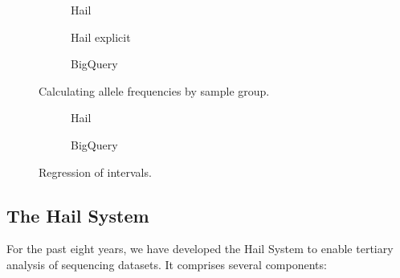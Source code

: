 \documentclass[10pt,a4paper%
]{article}
\begin{document}
\begin{figure}[h]
  \begin{subfigure}{\textwidth}
    
    \caption{Hail}
    \label{fig:query-example-two-hail-builtin}
  \end{subfigure}

  \begin{subfigure}{\textwidth}
    
    \caption{Hail explicit}
    \label{fig:query-example-two-hail}
  \end{subfigure}

  \begin{subfigure}{\textwidth}
    
    \caption{BigQuery}
    \label{fig:query-example-two-bigquery}
  \end{subfigure}
  \caption{Calculating allele frequencies by sample group.}
  \label{fig:query-example-two}
\end{figure}

\begin{figure}[h]
  \begin{subfigure}{\textwidth}
    
    \caption{Hail}
    \label{fig:query-example-three-hail}
  \end{subfigure}

  \begin{subfigure}{\textwidth}
    
    \caption{BigQuery}
    \label{fig:query-example-three-bigquery}
  \end{subfigure}
  \caption{Regression of intervals.}
  \label{fig:query-example-three}
\end{figure}

\subsection{The Hail System}

For the past eight years, we have developed the Hail System to enable tertiary analysis of
sequencing datasets. It comprises several components:
\end{document}
